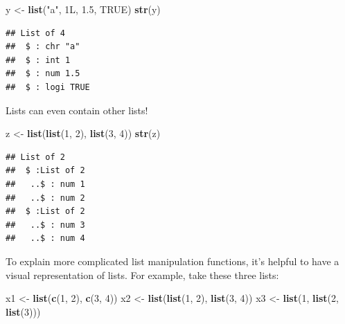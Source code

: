 \documentclass[
]{book}
\newenvironment{Shaded}{\begin{snugshade}}{\end{snugshade}}
\newcommand{\DecValTok}[1]{\textcolor[rgb]{0.00,0.00,0.81}{#1}}
\newcommand{\FloatTok}[1]{\textcolor[rgb]{0.00,0.00,0.81}{#1}}
\newcommand{\KeywordTok}[1]{\textcolor[rgb]{0.13,0.29,0.53}{\textbf{#1}}}
\newcommand{\NormalTok}[1]{#1}
\newcommand{\OtherTok}[1]{\textcolor[rgb]{0.56,0.35,0.01}{#1}}
\newcommand{\StringTok}[1]{\textcolor[rgb]{0.31,0.60,0.02}{#1}}
\begin{document}
\begin{Shaded}
\begin{Highlighting}[]
\NormalTok{y <-}\StringTok{ }\KeywordTok{list}\NormalTok{(}\StringTok{"a"}\NormalTok{, 1L, }\FloatTok{1.5}\NormalTok{, }\OtherTok{TRUE}\NormalTok{)}
\KeywordTok{str}\NormalTok{(y)}
\end{Highlighting}
\end{Shaded}

\begin{verbatim}
## List of 4
##  $ : chr "a"
##  $ : int 1
##  $ : num 1.5
##  $ : logi TRUE
\end{verbatim}

Lists can even contain other lists!

\begin{Shaded}
\begin{Highlighting}[]
\NormalTok{z <-}\StringTok{ }\KeywordTok{list}\NormalTok{(}\KeywordTok{list}\NormalTok{(}\DecValTok{1}\NormalTok{, }\DecValTok{2}\NormalTok{), }\KeywordTok{list}\NormalTok{(}\DecValTok{3}\NormalTok{, }\DecValTok{4}\NormalTok{))}
\KeywordTok{str}\NormalTok{(z)}
\end{Highlighting}
\end{Shaded}

\begin{verbatim}
## List of 2
##  $ :List of 2
##   ..$ : num 1
##   ..$ : num 2
##  $ :List of 2
##   ..$ : num 3
##   ..$ : num 4
\end{verbatim}

To explain more complicated list manipulation functions, it's helpful to have a visual representation of lists.
For example, take these three lists:

\begin{Shaded}
\begin{Highlighting}[]
\NormalTok{x1 <-}\StringTok{ }\KeywordTok{list}\NormalTok{(}\KeywordTok{c}\NormalTok{(}\DecValTok{1}\NormalTok{, }\DecValTok{2}\NormalTok{), }\KeywordTok{c}\NormalTok{(}\DecValTok{3}\NormalTok{, }\DecValTok{4}\NormalTok{))}
\NormalTok{x2 <-}\StringTok{ }\KeywordTok{list}\NormalTok{(}\KeywordTok{list}\NormalTok{(}\DecValTok{1}\NormalTok{, }\DecValTok{2}\NormalTok{), }\KeywordTok{list}\NormalTok{(}\DecValTok{3}\NormalTok{, }\DecValTok{4}\NormalTok{))}
\NormalTok{x3 <-}\StringTok{ }\KeywordTok{list}\NormalTok{(}\DecValTok{1}\NormalTok{, }\KeywordTok{list}\NormalTok{(}\DecValTok{2}\NormalTok{, }\KeywordTok{list}\NormalTok{(}\DecValTok{3}\NormalTok{)))}
\end{Highlighting}
\end{Shaded}
\end{document}

